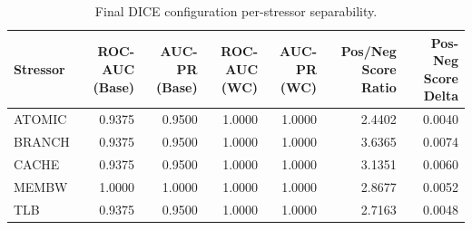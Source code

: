 \begin{table}[t]
\centering
\caption{Final DICE configuration per-stressor separability.}
\label{tab:dice_full_stressor}
\footnotesize
\begin{tabular}{lrrrrrr}
\toprule
Stressor & ROC-AUC (Base) & AUC-PR (Base) & ROC-AUC (WC) & AUC-PR (WC) & Pos/Neg Score Ratio & Pos-Neg Score Delta \\
\midrule
ATOMIC & 0.9375 & 0.9500 & 1.0000 & 1.0000 & 2.4402 & 0.0040 \\
BRANCH & 0.9375 & 0.9500 & 1.0000 & 1.0000 & 3.6365 & 0.0074 \\
CACHE & 0.9375 & 0.9500 & 1.0000 & 1.0000 & 3.1351 & 0.0060 \\
MEMBW & 1.0000 & 1.0000 & 1.0000 & 1.0000 & 2.8677 & 0.0052 \\
TLB & 0.9375 & 0.9500 & 1.0000 & 1.0000 & 2.7163 & 0.0048 \\
\bottomrule
\end{tabular}

\end{table}
